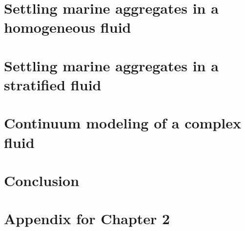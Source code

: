 \documentclass[11pt,oneside,chapterheads]{UCMerced}
\theoremstyle{plain}%
\theoremstyle{definition}
\begin{document}
\chapter{Settling marine aggregates in a homogeneous fluid}
\label{ch:2}



\chapter{Settling marine aggregates in a stratified fluid}
\label{ch:3}
 

\chapter{Continuum modeling of a complex fluid}
\label{ch:4}
 

\chapter{Conclusion}
\label{ch:conclusion}
 

\printbibliography

\appendix
\chapter{Appendix for Chapter 2}

\end{document}
